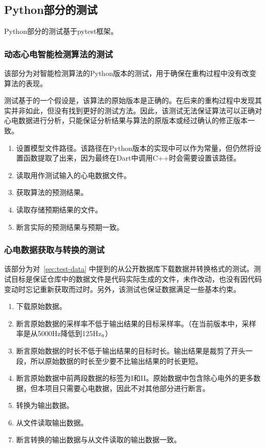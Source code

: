 \subsection{Python部分的测试}\label{subsec:test-python}

Python部分的测试基于pytest框架。

\subsubsection{动态心电智能检测算法的测试}

该部分为对智能检测算法的Python版本的测试，用于确保在重构过程中没有改变算法的表现。

测试基于的一个假设是，该算法的原始版本是正确的。在后来的重构过程中发现其实并非如此，但没有找到更好的测试方法。因此，该测试无法保证算法可以正确对心电数据进行分析，只能保证分析结果与算法的原版本或经过确认的修正版本一致。

\begin{enumerate}
    \item 设置模型文件路径。该路径在Python版本的实现中可以作为常量，但仍然将设置函数提取了出来，因为最终在Dart中调用C++时会需要设置该路径。
    \item 读取用作测试输入的心电数据文件。
    \item 获取算法的预测结果。
    \item 读取存储预期结果的文件。
    \item 断言实际的预测结果与预期一致。
\end{enumerate}

\subsubsection{心电数据获取与转换的测试}

该部分为对~\ref{sec:test-data} 中提到的从公开数据库下载数据并转换格式的测试。测试目标是保证仓库中的数据文件是代码实际生成的文件，未作改动，也没有因代码变动时忘记重新获取而过时。另外，该测试也保证数据满足一些基本约束。

\begin{enumerate}
    \item 下载原始数据。
    \item 断言原始数据的采样率不低于输出结果的目标采样率。（在当前版本中，采样率是从5000Hz降低到125Hz。）
    \item 断言原始数据的时长不低于输出结果的目标时长。输出结果是裁剪了开头一段，所以原始数据的时长至少要不比输出结果的时长更短。
    \item 断言原始数据中前两段数据的标签为I和II。原始数据中包含除心电外的更多数据，但本项目只需要心电数据，因此不对其他部分进行断言。
    \item 转换为输出数据。
    \item 从文件读取输出数据。
    \item 断言转换的输出数据与从文件读取的输出数据一致。
\end{enumerate}

